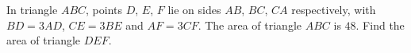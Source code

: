 In triangle $ABC$, points $D$, $E$, $F$ lie on sides $AB$, $BC$, $CA$ respectively, with $BD=3AD$, $CE=3BE$ and $AF=3CF$. The area of triangle $ABC$ is $48$. Find the area of triangle $DEF$.
